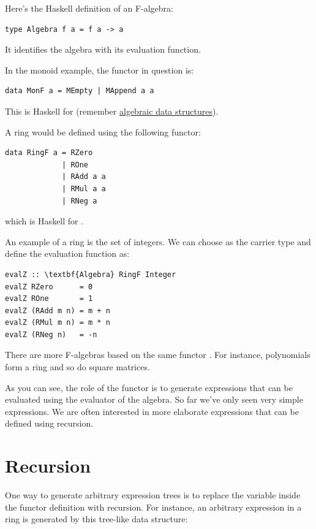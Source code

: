Here's the Haskell definition of an F-algebra:

\begin{Verbatim}[commandchars=\\\{\}]
type Algebra f a = f a -> a
\end{Verbatim}
It identifies the algebra with its evaluation function.

In the monoid example, the functor in question is:

\begin{Verbatim}[commandchars=\\\{\}]
data MonF a = MEmpty | MAppend a a
\end{Verbatim}
This is Haskell for  (remember
\hyperref[simple-algebraic-data-types]{algebraic
data structures}).

A ring would be defined using the following functor:

\begin{Verbatim}[commandchars=\\\{\}]
data RingF a = RZero
             | ROne
             | RAdd a a
             | RMul a a
             | RNeg a
\end{Verbatim}
which is Haskell for .

An example of a ring is the set of integers. We can choose
 as the carrier type and define the evaluation function
as:

\begin{Verbatim}[commandchars=\\\{\}]
evalZ :: \textbf{Algebra} RingF Integer
evalZ RZero      = 0
evalZ ROne       = 1
evalZ (RAdd m n) = m + n
evalZ (RMul m n) = m * n
evalZ (RNeg n)   = -n
\end{Verbatim}
There are more F-algebras based on the same functor . For
instance, polynomials form a ring and so do square matrices.

As you can see, the role of the functor is to generate expressions that
can be evaluated using the evaluator of the algebra. So far we've only
seen very simple expressions. We are often interested in more elaborate
expressions that can be defined using recursion.

\section{Recursion}\label{recursion}

One way to generate arbitrary expression trees is to replace the
variable  inside the functor definition with recursion. For
instance, an arbitrary expression in a ring is generated by this
tree-like data structure:

